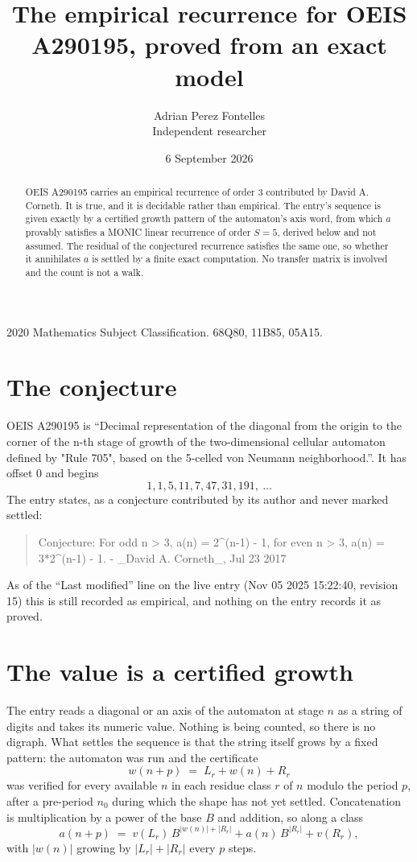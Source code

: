 \documentclass[11pt,a4paper]{article}
\title{The empirical recurrence for OEIS A290195, proved from an exact model}
\author{Adrian Perez Fontelles\\ \small Independent researcher}
\date{6 September 2026}
\theoremstyle{plain}
\theoremstyle{definition}
\begin{document}
\maketitle

\begin{abstract}
OEIS A290195 carries an empirical recurrence of order $3$ contributed by David A. Corneth. It is true, and it is
decidable rather than empirical. The entry's sequence is given exactly by a certified growth pattern of the automaton's axis word, from
which $a$ provably satisfies a MONIC linear recurrence of order $S=5$, derived below and not
assumed. The residual of the conjectured recurrence satisfies the same one, so whether it
annihilates $a$ is settled by a finite exact computation. No transfer matrix is involved and
the count is not a walk.
\end{abstract}

\noindent\small 2020 Mathematics Subject Classification. 68Q80, 11B85, 05A15.\normalsize

\section{The conjecture}

OEIS A290195 is ``Decimal representation of the diagonal from the origin to the corner of the n-th stage of growth of the two-dimensional cellular automaton defined by "Rule 705", based on the 5-celled von Neumann neighborhood.''. It has offset $0$ and begins
\[
1, 1, 5, 11, 7, 47, 31, 191,\ \dots
\]
The entry states, as a conjecture contributed by its author and never marked settled:
\begin{quote}
Conjecture: For odd n > 3, a(n) = 2\^{}(n-1) - 1, for even n > 3, a(n) = 3*2\^{}(n-1) - 1. - \_David A. Corneth\_, Jul 23 2017
\end{quote}
As of the ``Last modified'' line on the live entry (Nov 05 2025 15:22:40, revision 15)
this is still recorded as empirical, and nothing on the entry records it as proved.

\section{The value is a certified growth}

The entry reads a diagonal or an axis of the automaton at stage $n$ as a string of digits and takes its
numeric value. Nothing is being counted, so there is no digraph. What settles the sequence is
that the string itself grows by a fixed pattern: the automaton was run and the certificate
\[
w(n+p)\;=\;L_r + w(n) + R_r
\]
was verified for every available $n$ in each residue class $r$ of $n$ modulo the period $p$,
after a pre-period $n_0$ during which the shape has not yet settled. Concatenation is
multiplication by a power of the base $B$ and addition, so along a class
\[
a(n+p)\;=\;v(L_r)\,B^{|w(n)|+|R_r|} + a(n)\,B^{|R_r|} + v(R_r),
\]
with $|w(n)|$ growing by $|L_r|+|R_r|$ every $p$ steps.
\end{document}
